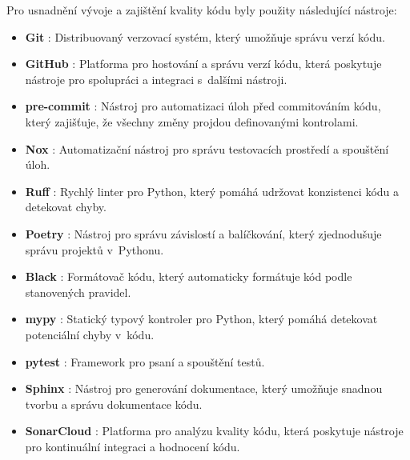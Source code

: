 Pro usnadnění vývoje a zajištění kvality kódu byly použity následující nástroje:
\begin{itemize}
    \item \textbf{Git} \cite{git}: Distribuovaný verzovací systém, který umožňuje správu verzí kódu.
    \item \textbf{GitHub} \cite{github}:  Platforma pro hostování a správu verzí kódu, která poskytuje nástroje pro spolupráci a integraci s~dalšími nástroji.
    \item \textbf{pre-commit} \cite{precommit}: Nástroj pro automatizaci úloh před commitováním kódu, který zajišťuje, že všechny změny projdou definovanými kontrolami.
    \item \textbf{Nox} \cite{nox}: Automatizační nástroj pro správu testovacích prostředí a spouštění úloh.
    \item \textbf{Ruff} \cite{ruff}: Rychlý linter pro Python, který pomáhá udržovat konzistenci kódu a detekovat chyby.
    \item \textbf{Poetry} \cite{poetry}: Nástroj pro správu závislostí a balíčkování, který zjednodušuje správu projektů v~Pythonu.
    \item \textbf{Black} \cite{black}: Formátovač kódu, který automaticky formátuje kód podle stanovených pravidel.
    \item \textbf{mypy} \cite{mypy}:  Statický typový kontroler pro Python, který pomáhá detekovat potenciální chyby v~kódu.
    \item \textbf{pytest} \cite{pytest}: Framework pro psaní a spouštění testů.
    \item \textbf{Sphinx} \cite{sphinx}: Nástroj pro generování dokumentace, který umožňuje snadnou tvorbu a správu dokumentace kódu.
    \item \textbf{SonarCloud} \cite{sonarcloud}: Platforma pro analýzu kvality kódu, která poskytuje nástroje pro kontinuální integraci a hodnocení kódu.
\end{itemize}
